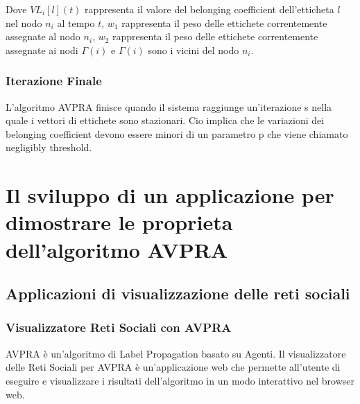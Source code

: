 \documentclass[a4paper,12pt]{report}
\begin{document}
		Dove $VL_i[l](t)$ rappresenta il valore del belonging coefficient dell'etticheta $l$ nel nodo $n_i$ al tempo $t$, $w_1$ rappresenta il peso delle ettichete correntemente assegnate al nodo $n_i$, $w_2$ rappresenta il peso delle ettichete correntemente assegnate ai nodi $\Gamma(i)$ e $\Gamma(i)$ sono i vicini del nodo $n_i$.

		\subsection{Iterazione Finale}
		L'algoritmo AVPRA finisce quando il sistema raggiunge un'iterazione s nella quale i vettori di ettichete sono stazionari. Cio implica che le variazioni dei belonging coefficient devono essere minori di un parametro p che viene chiamato negligibly threshold. 
		

\chapter[Il sviluppo dell'applicazione]{Il sviluppo di un applicazione per dimostrare le proprieta dell'algoritmo AVPRA}
\label{chapter4}

	\section{Applicazioni di visualizzazione delle reti sociali}
		
		\subsection{Visualizzatore Reti Sociali con AVPRA}
		AVPRA è un'algoritmo di Label Propagation basato su Agenti.
		Il visualizzatore delle Reti Sociali per AVPRA è un'applicazione web che permette all'utente di
		eseguire e visualizzare i risultati dell'algoritmo in un modo interattivo nel browser web. \cite{avpra}
		
\end{document}
